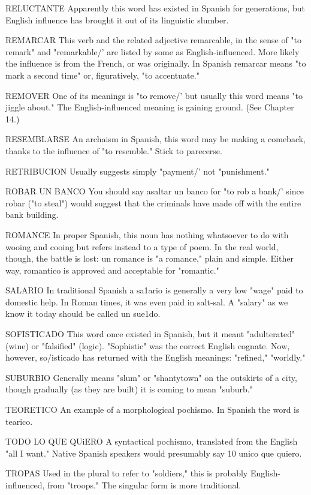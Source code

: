 {RELUCTANTE Apparently this word has existed in Spanish
for generations, but English influence has brought it out of its linguistic slumber.

REMARCAR This verb and the related adjective remarcable,
in the sense of "to remark" and "remarkable/' are listed by some as
English-influenced. More likely the influence is from the French, or
was originally. In Spanish remarcar means "to mark a second time"
or, figuratively, "to accentuate."

REMOVER One of its meanings is "to remove/' but usually
this word means "to jiggle about." The English-influenced meaning is
gaining ground. (See Chapter 14.)

RESEMBLARSE An archaism in Spanish, this word may be
making a comeback, thanks to the influence of "to resemble." Stick to
parecerse.

RETRIBUCION Usually suggests simply "payment/' not
"punishment."

ROBAR UN BANCO You should say asaltar un banco for "to
rob a bank/' since robar ("to steal") would suggest that the criminals
have made off with the entire bank building.

ROMANCE In proper Spanish, this noun has nothing whatsoever to do with wooing and cooing but refers instead to a type of
poem. In the real world, though, the battle is lost: un romance is "a
romance," plain and simple. Either way, romantico is approved and acceptable for "romantic."

SALARIO In traditional Spanish a sa1ario is generally a very
low "wage" paid to domestic help. In Roman times, it was even paid in
salt-sal. A "salary" as we know it today should be called un sue1do.

SOFISTICADO This word once existed in Spanish, but it
meant "adulterated" (wine) or "falsified" (logic). "Sophistic" was
the correct English cognate. Now, however, so/isticado has returned
with the English meanings: "refined," "worldly."

SUBURBIO Generally means "slum" or "shantytown" on the
outskirts of a city, though gradually (as they are built) it is coming to
mean "suburb."

TEORETICO An example of a morphological pochismo. In
Spanish the word is tearico.

TODO LO QUE QUiERO A syntactical pochismo, translated
from the English "all I want." Native Spanish speakers would presumably say 10 unico que quiero.

TROPAS Used in the plural to refer to "soldiers," this is
probably English-influenced, from "troops." The singular form is
more traditional.

}
